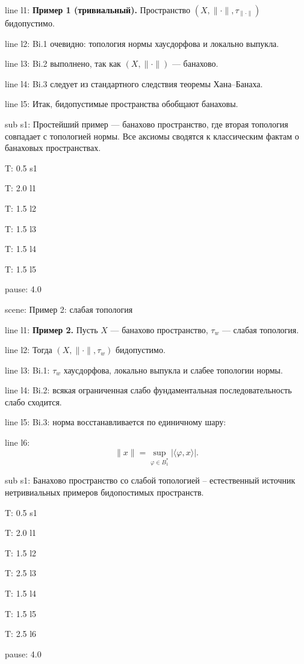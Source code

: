 \documentclass[a4paper,11pt]{article}
\let\ph\varphi
\begin{document}
line l1: {\textbf{Пример 1 (тривиальный).} Пространство $(X,\|\cdot\|,\tau_{\|\cdot\|})$ бидопустимо.}

line l2: {Bi.1 очевидно: топология нормы хаусдорфова и локально выпукла.}

line l3: {Bi.2 выполнено, так как $(X,\|\cdot\|)$ --- банахово.}

line l4: {Bi.3 следует из стандартного следствия теоремы Хана--Банаха.}

line l5: {Итак, бидопустимые пространства обобщают банаховы.}


sub s1: {Простейший пример --- банахово пространство, где вторая топология совпадает с топологией нормы. Все аксиомы сводятся к классическим фактам о банаховых пространствах.}


T: 0.5 s1

T: 2.0 l1

T: 1.5 l2

T: 1.5 l3

T: 1.5 l4

T: 1.5 l5

pause: 4.0



scene: {Пример 2: слабая топология}

line l1: {\textbf{Пример 2.} Пусть $X$ --- банахово пространство, $\tau_w$ --- слабая топология.}

line l2: {Тогда $(X,\|\cdot\|,\tau_w)$ бидопустимо.}

line l3: {Bi.1: $\tau_w$ хаусдорфова, локально выпукла и слабее топологии нормы.}

line l4: {Bi.2: всякая ограниченная слабо фундаментальная последовательность слабо сходится.}

line l5: {Bi.3: норма восстанавливается по единичному шару:}

line l6: {$$\|x\|=\sup\limits_{\ph\in B_1^*}|\langle \ph, x \rangle|.$$}


sub s1: {Банахово пространство со слабой топологией – естественный источник нетривиальных примеров бидопостимых пространств.}


T: 0.5 s1

T: 2.0 l1

T: 1.5 l2

T: 2.5 l3

T: 1.5 l4

T: 1.5 l5

T: 2.5 l6

pause: 4.0


\end{document}
